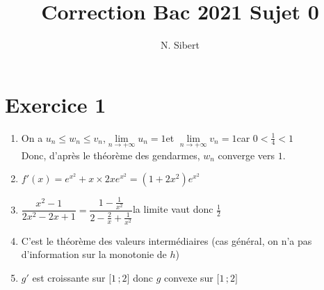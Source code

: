 \documentclass{scrartcl}
\title{Correction Bac 2021 Sujet 0}
\author{N. Sibert}
\begin{document}
    \maketitle

    \section*{Exercice 1}
    \begin{adjustwidth}{2em}{0pt}
        \begin{enumerate}
            \item {}\par 
            On a $u_n\leq w_n\leq v_n$,\quad$\lim\limits_{n\to +\infty}u_n=1$\quad et \quad$\lim\limits_{n\to +\infty}v_n=1$\quad car $0<\frac{1}{4}<1$ \\ Donc, d'après le théorème des gendarmes, $w_n$ converge vers $1$.            
            \item {}\par
            $f'(x)=e^{x^2}+x\times 2xe^{x^2}=\left(1+2x^2\right)e^{x^2}$
            \item {}\par
            $\dfrac{x^2-1}{2x^2-2x+1}=\dfrac{1-\frac{1}{x^2}}{2-\frac{2}{x}+\frac{1}{x^2}}$\quad la limite vaut donc $\frac{1}{2}$
            \item {}\par
            C'est le théorème des valeurs intermédiaires (cas général, on n'a pas d'information sur la monotonie de $h$)
            \item {}\par
            $g'$ est croissante sur $\big[1\,;2\big]$ donc $g$ convexe sur $\big[1\,;2\big]$
        \end{enumerate}
    \end{adjustwidth}
    
\pagebreak    
    
\end{document}
